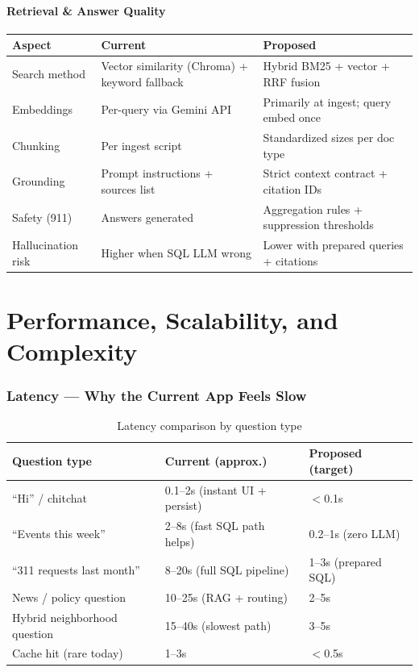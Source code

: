 \documentclass[11pt,a4paper]{article}
\begin{document}
\subsection{Retrieval \& Answer Quality}

\begin{longtable}{@{}p{3.2cm}p{5.3cm}p{5.3cm}@{}}
\toprule
\textbf{Aspect} & \textbf{Current} & \textbf{Proposed} \\
\midrule
\endhead
Search method & Vector similarity (Chroma) + keyword fallback & Hybrid BM25 + vector + RRF fusion \\
Embeddings & Per-query via Gemini API & Primarily at ingest; query embed once \\
Chunking & Per ingest script & Standardized sizes per doc type \\
Grounding & Prompt instructions + sources list & Strict context contract + citation IDs \\
Safety (911) & Answers generated & Aggregation rules + suppression thresholds \\
Hallucination risk & Higher when SQL LLM wrong & Lower with prepared queries + citations \\
\bottomrule
\end{longtable}

\part{Performance, Scalability, and Complexity}

\section{Latency --- Why the Current App Feels Slow}

\begin{table}[h]
\centering
\small
\begin{tabular}{@{}lll@{}}
\toprule
\textbf{Question type} & \textbf{Current (approx.)} & \textbf{Proposed (target)} \\
\midrule
``Hi'' / chitchat & 0.1--2s (instant UI + persist) & $<$0.1s \\
``Events this week'' & 2--8s (fast SQL path helps) & 0.2--1s (zero LLM) \\
``311 requests last month'' & 8--20s (full SQL pipeline) & 1--3s (prepared SQL) \\
News / policy question & 10--25s (RAG + routing) & 2--5s \\
Hybrid neighborhood question & 15--40s (slowest path) & 3--5s \\
Cache hit (rare today) & 1--3s & $<$0.5s \\
\bottomrule
\end{tabular}
\caption{Latency comparison by question type}
\end{table}
\end{document}
